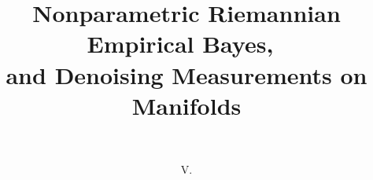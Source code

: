 \documentclass[preprint]{imsart}
\theoremstyle{plain}
\theoremstyle{definition}
\begin{document}
\begin{frontmatter}
\title{Nonparametric Riemannian Empirical Bayes,~\\and Denoising Measurements on Manifolds}

\begin{aug}
\author[A]{~}
\author[B]{~V.~}
\author[A]{~}
\address[A]{Department of Statistics, Columbia University, New York, NY, USA}

\address[B]{Institut de Math\'ematiques, \'Ecole Polytechnique F\'ed\'erale de Lausanne, CH}
\end{aug}


\end{frontmatter}
\end{document}
